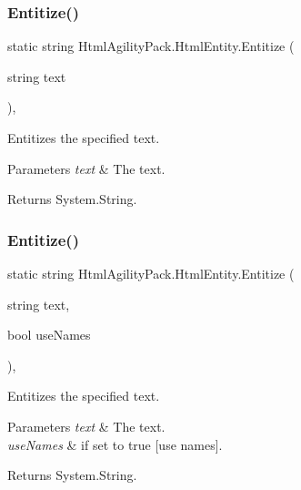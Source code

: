 \subsubsection{\texorpdfstring{Entitize()}{Entitize()}\hspace{0.1cm}{\footnotesize\ttfamily [2/4]}}
{\footnotesize\ttfamily static string Html\+Agility\+Pack.\+Html\+Entity.\+Entitize (\begin{DoxyParamCaption}\item[{string}]{text }\end{DoxyParamCaption})\hspace{0.3cm}{\ttfamily [inline]}, {\ttfamily [static]}}



Entitizes the specified text. 


\begin{DoxyParams}{Parameters}
{\em text} & The text.\\
\hline
\end{DoxyParams}
\begin{DoxyReturn}{Returns}
System.\+String.
\end{DoxyReturn}
\mbox{\label{class_html_agility_pack_1_1_html_entity_a82d69919761ce06894ea5891a043ee99}} 
\subsubsection{\texorpdfstring{Entitize()}{Entitize()}\hspace{0.1cm}{\footnotesize\ttfamily [3/4]}}
{\footnotesize\ttfamily static string Html\+Agility\+Pack.\+Html\+Entity.\+Entitize (\begin{DoxyParamCaption}\item[{string}]{text,  }\item[{bool}]{use\+Names }\end{DoxyParamCaption})\hspace{0.3cm}{\ttfamily [inline]}, {\ttfamily [static]}}



Entitizes the specified text. 


\begin{DoxyParams}{Parameters}
{\em text} & The text.\\
\hline
{\em use\+Names} & if set to {\ttfamily true} \mbox{[}use names\mbox{]}.\\
\hline
\end{DoxyParams}
\begin{DoxyReturn}{Returns}
System.\+String.
\end{DoxyReturn}
\mbox{\label{class_html_agility_pack_1_1_html_entity_a9f2705a754944fb7454590094c38efb1}} 
